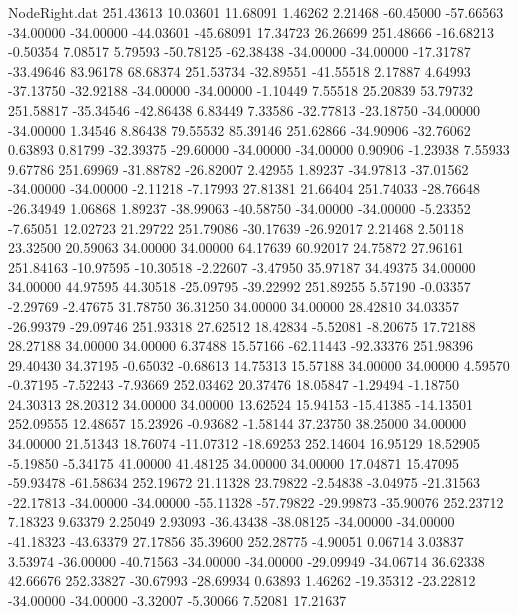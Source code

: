 \begin{filecontents}{NodeRight.dat}
 251.43613   10.03601   11.68091     1.46262    2.21468  -60.45000  -57.66563  -34.00000  -34.00000  -44.03601  -45.68091   17.34723   26.26699
 251.48666  -16.68213   -0.50354     7.08517    5.79593  -50.78125  -62.38438  -34.00000  -34.00000  -17.31787  -33.49646   83.96178   68.68374
 251.53734  -32.89551  -41.55518     2.17887    4.64993  -37.13750  -32.92188  -34.00000  -34.00000   -1.10449    7.55518   25.20839   53.79732
 251.58817  -35.34546  -42.86438     6.83449    7.33586  -32.77813  -23.18750  -34.00000  -34.00000    1.34546    8.86438   79.55532   85.39146
 251.62866  -34.90906  -32.76062     0.63893    0.81799  -32.39375  -29.60000  -34.00000  -34.00000    0.90906   -1.23938    7.55933    9.67786
 251.69969  -31.88782  -26.82007     2.42955    1.89237  -34.97813  -37.01562  -34.00000  -34.00000   -2.11218   -7.17993   27.81381   21.66404
 251.74033  -28.76648  -26.34949     1.06868    1.89237  -38.99063  -40.58750  -34.00000  -34.00000   -5.23352   -7.65051   12.02723   21.29722
 251.79086  -30.17639  -26.92017     2.21468    2.50118   23.32500   20.59063   34.00000   34.00000   64.17639   60.92017   24.75872   27.96161
 251.84163  -10.97595  -10.30518    -2.22607   -3.47950   35.97187   34.49375   34.00000   34.00000   44.97595   44.30518  -25.09795  -39.22992
 251.89255    5.57190   -0.03357    -2.29769   -2.47675   31.78750   36.31250   34.00000   34.00000   28.42810   34.03357  -26.99379  -29.09746
 251.93318   27.62512   18.42834    -5.52081   -8.20675   17.72188   28.27188   34.00000   34.00000    6.37488   15.57166  -62.11443  -92.33376
 251.98396   29.40430   34.37195    -0.65032   -0.68613   14.75313   15.57188   34.00000   34.00000    4.59570   -0.37195   -7.52243   -7.93669
 252.03462   20.37476   18.05847    -1.29494   -1.18750   24.30313   28.20312   34.00000   34.00000   13.62524   15.94153  -15.41385  -14.13501
 252.09555   12.48657   15.23926    -0.93682   -1.58144   37.23750   38.25000   34.00000   34.00000   21.51343   18.76074  -11.07312  -18.69253
 252.14604   16.95129   18.52905    -5.19850   -5.34175   41.00000   41.48125   34.00000   34.00000   17.04871   15.47095  -59.93478  -61.58634
 252.19672   21.11328   23.79822    -2.54838   -3.04975  -21.31563  -22.17813  -34.00000  -34.00000  -55.11328  -57.79822  -29.99873  -35.90076
 252.23712    7.18323    9.63379     2.25049    2.93093  -36.43438  -38.08125  -34.00000  -34.00000  -41.18323  -43.63379   27.17856   35.39600
 252.28775   -4.90051    0.06714     3.03837    3.53974  -36.00000  -40.71563  -34.00000  -34.00000  -29.09949  -34.06714   36.62338   42.66676
 252.33827  -30.67993  -28.69934     0.63893    1.46262  -19.35312  -23.22812  -34.00000  -34.00000   -3.32007   -5.30066    7.52081   17.21637

\end{filecontents}
